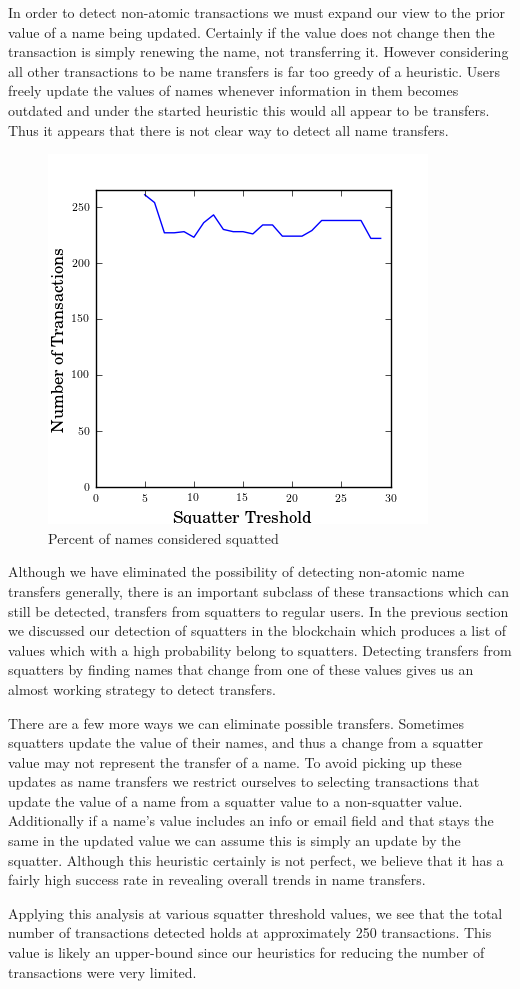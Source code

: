 In order to detect non-atomic transactions we must expand our view to the prior value of a name being updated. Certainly if the value does not change then the transaction is simply renewing the name, not transferring it. However considering all other transactions to be name transfers is far too greedy of a heuristic. Users freely update the values of names whenever information in them becomes outdated and under the started heuristic this would all appear to be transfers. Thus it appears that there is not clear way to detect all name transfers.

\begin{figure}
  \centering
  \includegraphics[width=0.9\columnwidth]{figures/transfers}
  \caption{Percent of names considered squatted}
  \label{fig:percentSquatter}
\end{figure}

Although we have eliminated the possibility of detecting non-atomic name transfers generally, there is an important subclass of these transactions which can still be detected, transfers from squatters to regular users. In the previous section we discussed our detection of squatters in the blockchain which produces a list of values which with a high probability belong to squatters. Detecting transfers from squatters by finding names that change from one of these values gives us an almost working strategy to detect transfers.

There are a few more ways we can eliminate possible transfers. Sometimes squatters update the value of their names, and thus a change from a squatter value may not represent the transfer of a name. To avoid picking up these updates as name transfers we restrict ourselves to selecting transactions that update the value of a name from a squatter value to a non-squatter value. Additionally if a name's value includes an info or email field and that stays the same in the updated value we can assume this is simply an update by the squatter. Although this heuristic certainly is not perfect, we believe that it has a fairly high success rate in revealing overall trends in name transfers.

Applying this analysis at various squatter threshold values, we see that the total number of transactions detected holds at approximately 250 transactions. This value is likely an upper-bound since our heuristics for reducing the number of transactions were very limited.
	
